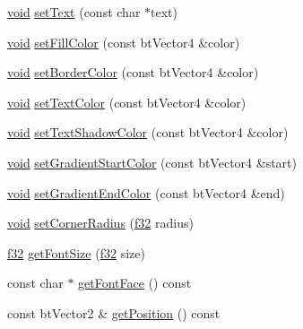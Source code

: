 \begin{DoxyCompactItemize}
\item 
\mbox{\hyperlink{_thread_8h_af1e856da2e658414cb2456cb6f7ebc66}{void}} \mbox{\hyperlink{classnjli_1_1_button_h_u_d_a8346d046cb538f1c0269f1ce10354024}{set\+Text}} (const char $\ast$text)
\item 
\mbox{\hyperlink{_thread_8h_af1e856da2e658414cb2456cb6f7ebc66}{void}} \mbox{\hyperlink{classnjli_1_1_button_h_u_d_a845ff0e5328fe156aff8d20e90b04602}{set\+Fill\+Color}} (const bt\+Vector4 \&color)
\item 
\mbox{\hyperlink{_thread_8h_af1e856da2e658414cb2456cb6f7ebc66}{void}} \mbox{\hyperlink{classnjli_1_1_button_h_u_d_aaf91ad4aac85500c011a9b0bd658dc7f}{set\+Border\+Color}} (const bt\+Vector4 \&color)
\item 
\mbox{\hyperlink{_thread_8h_af1e856da2e658414cb2456cb6f7ebc66}{void}} \mbox{\hyperlink{classnjli_1_1_button_h_u_d_a478e096b1d257953d612fabd1e2eaf62}{set\+Text\+Color}} (const bt\+Vector4 \&color)
\item 
\mbox{\hyperlink{_thread_8h_af1e856da2e658414cb2456cb6f7ebc66}{void}} \mbox{\hyperlink{classnjli_1_1_button_h_u_d_a8fededdc4f97b54d54568a6acfd43e4e}{set\+Text\+Shadow\+Color}} (const bt\+Vector4 \&color)
\item 
\mbox{\hyperlink{_thread_8h_af1e856da2e658414cb2456cb6f7ebc66}{void}} \mbox{\hyperlink{classnjli_1_1_button_h_u_d_ab2cca8ad90957d9d2baf24ce1d844d5e}{set\+Gradient\+Start\+Color}} (const bt\+Vector4 \&start)
\item 
\mbox{\hyperlink{_thread_8h_af1e856da2e658414cb2456cb6f7ebc66}{void}} \mbox{\hyperlink{classnjli_1_1_button_h_u_d_a6b842db44f87687d59ba28d1a090da61}{set\+Gradient\+End\+Color}} (const bt\+Vector4 \&end)
\item 
\mbox{\hyperlink{_thread_8h_af1e856da2e658414cb2456cb6f7ebc66}{void}} \mbox{\hyperlink{classnjli_1_1_button_h_u_d_a38b826893d35569f5f4bad03282523da}{set\+Corner\+Radius}} (\mbox{\hyperlink{_util_8h_a5f6906312a689f27d70e9d086649d3fd}{f32}} radius)
\item 
\mbox{\hyperlink{_util_8h_a5f6906312a689f27d70e9d086649d3fd}{f32}} \mbox{\hyperlink{classnjli_1_1_button_h_u_d_a256f464d6b5893f9cfa3eceb15f46220}{get\+Font\+Size}} (\mbox{\hyperlink{_util_8h_a5f6906312a689f27d70e9d086649d3fd}{f32}} size)
\item 
const char $\ast$ \mbox{\hyperlink{classnjli_1_1_button_h_u_d_a83f04cb866e1b369fd0b93605b1237a5}{get\+Font\+Face}} () const
\item 
const bt\+Vector2 \& \mbox{\hyperlink{classnjli_1_1_button_h_u_d_aa421a6d2aa947e9085fcf2341d0f053e}{get\+Position}} () const

\end{DoxyCompactItemize}
